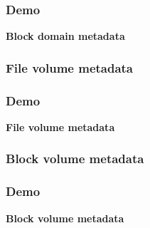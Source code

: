 \documentclass[10pt,utf8]{beamer}
\begin{document}
\begin{frame}
  \frametitle{Demo}
	\centering
	\huge{\textbf{Block domain metadata}}
\end{frame}

\begin{frame}
	\frametitle{File volume metadata}
\end{frame}

\begin{frame}
  \frametitle{Demo}
	\centering
	\huge{\textbf{File volume metadata}}
\end{frame}

\begin{frame}
	\frametitle{Block volume metadata}
\end{frame}

\begin{frame}
  \frametitle{Demo}
	\centering
	\huge{\textbf{Block volume metadata}}
\end{frame}
\end{document}
